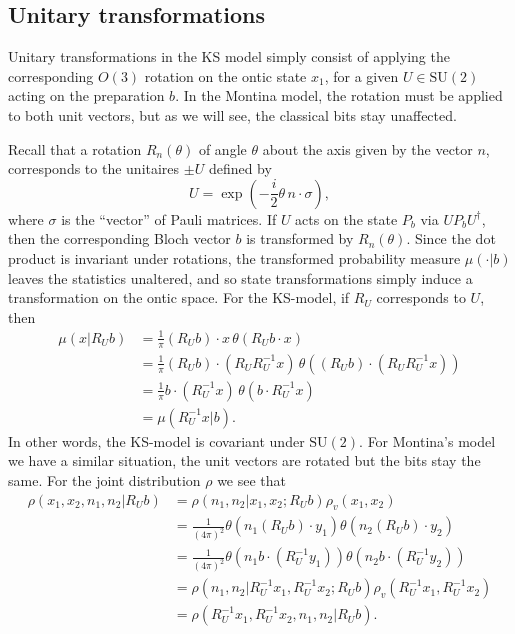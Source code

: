 \documentclass[12pt,draft]{article}
\theoremstyle{definition}
\theoremstyle{plain}
\begin{document}
    \subsection{Unitary transformations}

    Unitary transformations in the KS model simply consist
    of applying the corresponding $O(3)$ rotation on the
    ontic state $x_1$, for a given $U \in \text{SU}(2)$
    acting on the preparation $b$. In the Montina model, the
    rotation must be applied to both unit vectors, but as we
    will see, the classical bits stay unaffected.

    Recall that a rotation $R_n(\theta)$ of angle $\theta$
    about the axis given by the vector $n$, corresponds to
    the unitaires $\pm U$ defined by
    \begin{equation}
        U
        = \exp\left( -\frac{i}{2} \theta \, n \cdot \sigma
        \right), 
    \end{equation}
    where $\sigma$ is the ``vector'' of Pauli matrices. If
    $U$ acts on the state $P_b$ via $U P_b U^{\dag}$, then
    the corresponding Bloch vector $b$ is transformed by
    $R_n(\theta)$. Since the dot product is invariant under
    rotations, the transformed probability measure
    $\mu(\cdot|b)$ leaves the statistics unaltered, and so
    state transformations simply induce a transformation on
    the ontic space. For the KS-model, if $R_U$ corresponds
    to $U$, then 
    \begin{align}
        \mu(x | R_U b)
        &= \frac{1}{\pi} (R_U b) \cdot x \, \theta(R_U b
        \cdot x) \\
        &= \frac{1}{\pi} (R_U b) \cdot (R_U R_U^{-1} x) \,
        \theta((R_U b) \cdot (R_U R_U^{-1}x)) \\
        &= \frac{1}{\pi} b \cdot (R_U^{-1}x) \,
        \theta(b \cdot R_U^{-1}x) \\
        &= \mu(R_U^{-1} x | b).
    \end{align}
    In other words, the KS-model is covariant under
    $\text{SU}(2)$. For Montina's model we have a similar
    situation, the unit vectors are rotated but the bits
    stay the same. For the joint distribution $\rho$ we see
    that
    \begin{align}
        \rho(x_1,x_2,n_1,n_2 | R_U b)
        &= \rho(n_1,n_2 | x_1,x_2; R_U b) \rho_v(x_1,x_2) \\
        &= \frac{1}{(4\pi)^2} 
        \theta(n_1 (R_U b) \cdot y_1) \theta(n_2 (R_U b)
        \cdot y_2) \\
        &= \frac{1}{(4\pi)^2} \theta(n_1 b \cdot
        (R_U^{-1}y_1)) \theta(n_2 b \cdot (R_U^{-1} y_2)) \\
        &= \rho(n_1,n_2 | R_U^{-1}x_1, R_U^{-1}x_2; R_U b)
        \rho_v(R_U^{-1}x_1, R_U^{-1}x_2) \\
        &= \rho(R_U^{-1}x_1, R_U^{-1}x_2, n_1, n_2 | R_U b).
    \end{align}
\end{document}

